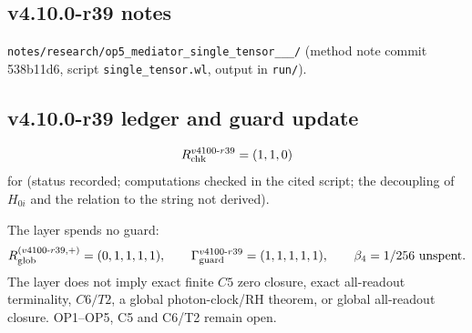 \subsection*{v4.10.0-r39 notes}
\label{subsec:v4100-r39-notes}

\texttt{notes/\allowbreak research/\allowbreak op5\_\allowbreak mediator\_\allowbreak single\_\allowbreak tensor\_\_\_/} (method note commit 538b11d6,
script \texttt{single\_\allowbreak tensor.wl}, output in \texttt{run/}).

\subsection*{v4.10.0-r39 ledger and guard update}
\label{subsec:v4100-r39-ledger-guard}

\[
R_{\rm chk}^{v4100\text{-}r39}=(1,1,0)
\]
for (status recorded; computations checked in the cited script; the decoupling of \(H_{0i}\) and the relation to the string not derived).

The layer spends no guard:
\[
R_{\rm glob}^{(v4100\text{-}r39,+)}=(0,1,1,1,1),
\qquad
\Gamma_{\rm guard}^{v4100\text{-}r39}=(1,1,1,1,1),
\qquad
\beta_4=1/256\ \text{unspent}.
\]
The layer does not imply exact finite \(C5\) zero closure, exact all-readout terminality, \(C6/T2\), a global photon-clock/RH theorem,
or global all-readout closure.  OP1--OP5, C5 and C6/T2 remain open.
